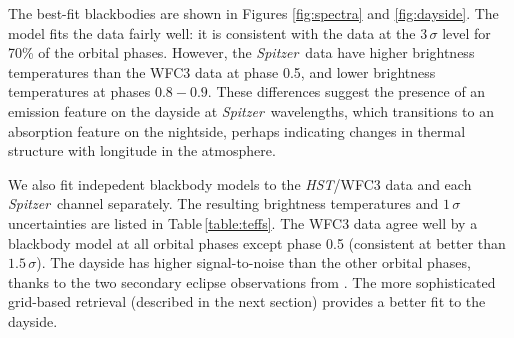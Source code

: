 \documentclass[twocolumn]{aastex61}
\newcommand{\project}[1]{\textsl{#1}}
\newcommand{\HST}{\project{HST}}
\newcommand{\Spitzer}{\project{Spitzer}}
\begin{document}
The best-fit blackbodies are shown in Figures \ref{fig:spectra} and \ref{fig:dayside}. The model fits the data fairly well: it is consistent with the data at the $3\,\sigma$ level for 70\% of the orbital phases. However, the \Spitzer\ data have higher brightness temperatures than the WFC3 data at phase 0.5, and lower brightness temperatures at phases $0.8 - 0.9$. These differences suggest the presence of an emission feature on the dayside at \Spitzer\ wavelengths, which transitions to an absorption feature on the nightside, perhaps indicating changes in thermal structure with longitude in the atmosphere.

We also fit indepedent blackbody models to the \HST/WFC3 data and each \Spitzer\ channel separately. The resulting brightness temperatures and $1\,\sigma$ uncertainties are listed in Table\,\ref{table:teffs}. The WFC3 data agree well by a blackbody model at all orbital phases except phase 0.5 (consistent at better than $1.5\,\sigma$). The dayside has higher signal-to-noise than the other orbital phases, thanks to the two secondary eclipse observations from \cite{cartier17}. The more sophisticated grid-based retrieval (described in the next section) provides a better fit to the dayside.



\end{document}
